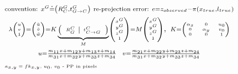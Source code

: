 {\begin{gather*}
	{\scriptstyle\tiny \text{convention: } x^G\doteq \left(R_C^G, t^G_{G\to 
	C}\right)} ~
	{\scriptstyle \text{re-projection error: }
	e = z_{observed}-\pi(x_{true}, l_{true})} \\
	{\tiny\scriptstyle \lambda \begin{pmatrix}
		u \\ v \\ 1
		\end{pmatrix} = 
	\begin{pmatrix}
	\tilde{u} \\ \tilde{v} \\ \tilde{w}
	\end{pmatrix} = K\underbrace{
	\left(\begin{array}{c|c}
	R_G^C & t^C_{C\to G}
	\end{array}\right)}_{M}
	\begin{pmatrix}
	x^G \\ y^G \\ z^G \\ 1
	\end{pmatrix} = 
	M\begin{pmatrix}
		x^G \\ y^G \\ z^G \\ 1
		\end{pmatrix}}, ~ {\tiny\scriptstyle K=\begin{pmatrix}
			\alpha_x & 0 & u_0 \\ 
			0 & \alpha_y & v_0 \\
			0 & 0 & 1
			\end{pmatrix}} \\ 
	{\scriptstyle\tiny u = \frac{m_{11}x + m_{12}y + m_{13}z + 
	m_{14}}{m_{31}x + m_{32}y + m_{33}z + m_{34}} \quad 
	v = \frac{m_{21}x + m_{22}y + m_{23}z + 
		m_{24}}{m_{31}x + m_{32}y + m_{33}z + m_{34}}} \\
	\text{\tiny $a_{x,y} = fk_{x,y}$, $u_0$, $v_0$ - PP in pixels}\hfill
\end{gather*}}